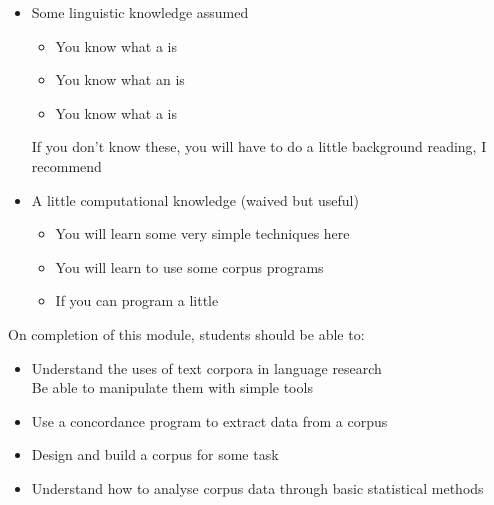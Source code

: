 \documentclass[a4paper,landscape,headrule,footrule]{foils}
\begin{document}

\begin{itemize}
\item Some linguistic knowledge assumed
  \begin{itemize}
  \item You know what a  is
  \item You know what an  is
  \item You know what a  is
  \end{itemize}
 If you don't know these, you will have to do a little background
 reading, I recommend \citet{Huddleston:1988} 
\item A little computational knowledge (waived but useful)
  \begin{itemize}
  \item You will learn some very simple techniques here
  \item You will learn to use some corpus programs
  \item If you can program a little 
  \end{itemize}
\end{itemize}




On completion of this module, students should be able to:

\begin{itemize}
\item Understand the uses of text corpora in language research
  \\ Be able to manipulate them with simple tools
\item Use a concordance program to extract data from a corpus
\item Design and build a corpus for some task
\item Understand how to analyse corpus data through basic statistical methods
\end{itemize}
    
\end{document}
